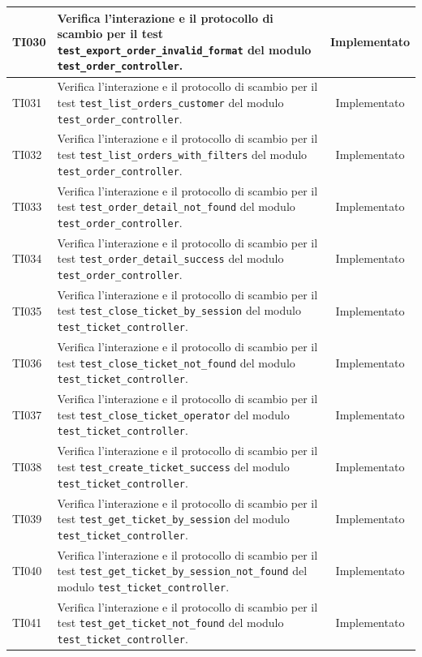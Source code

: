 \documentclass[a4paper,11pt,oneside]{scrartcl}
\begin{document}
\begin{longtable}{|p{1.9cm}|p{11.6cm}|c|}
    TI030 & Verifica l'interazione e il protocollo di scambio per il test \texttt{test\_export\_order\_invalid\_format} del modulo \texttt{test\_order\_controller}. & Implementato \\ \hline
    TI031 & Verifica l'interazione e il protocollo di scambio per il test \texttt{test\_list\_orders\_customer} del modulo \texttt{test\_order\_controller}. & Implementato \\ \hline
    TI032 & Verifica l'interazione e il protocollo di scambio per il test \texttt{test\_list\_orders\_with\_filters} del modulo \texttt{test\_order\_controller}. & Implementato \\ \hline
    TI033 & Verifica l'interazione e il protocollo di scambio per il test \texttt{test\_order\_detail\_not\_found} del modulo \texttt{test\_order\_controller}. & Implementato \\ \hline
    TI034 & Verifica l'interazione e il protocollo di scambio per il test \texttt{test\_order\_detail\_success} del modulo \texttt{test\_order\_controller}. & Implementato \\ \hline
    TI035 & Verifica l'interazione e il protocollo di scambio per il test \texttt{test\_close\_ticket\_by\_session} del modulo \texttt{test\_ticket\_controller}. & Implementato \\ \hline
    TI036 & Verifica l'interazione e il protocollo di scambio per il test \texttt{test\_close\_ticket\_not\_found} del modulo \texttt{test\_ticket\_controller}. & Implementato \\ \hline
    TI037 & Verifica l'interazione e il protocollo di scambio per il test \texttt{test\_close\_ticket\_operator} del modulo \texttt{test\_ticket\_controller}. & Implementato \\ \hline
    TI038 & Verifica l'interazione e il protocollo di scambio per il test \texttt{test\_create\_ticket\_success} del modulo \texttt{test\_ticket\_controller}. & Implementato \\ \hline
    TI039 & Verifica l'interazione e il protocollo di scambio per il test \texttt{test\_get\_ticket\_by\_session} del modulo \texttt{test\_ticket\_controller}. & Implementato \\ \hline
    TI040 & Verifica l'interazione e il protocollo di scambio per il test \texttt{test\_get\_ticket\_by\_session\_not\_found} del modulo \texttt{test\_ticket\_controller}. & Implementato \\ \hline
    TI041 & Verifica l'interazione e il protocollo di scambio per il test \texttt{test\_get\_ticket\_not\_found} del modulo \texttt{test\_ticket\_controller}. & Implementato \\ \hline

\end{longtable}
\end{document}
